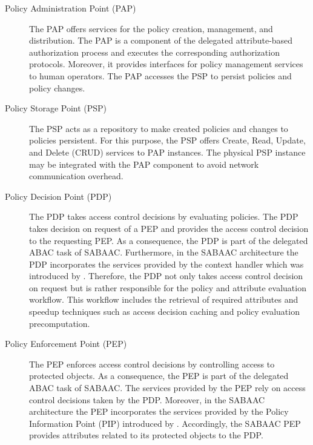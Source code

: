 \begin{description}
    \item[Policy Administration Point (PAP)] The PAP offers services for the policy creation, management, and distribution.
    The PAP is a component of the delegated attribute-based authorization process and executes the corresponding authorization protocols.
    Moreover, it provides interfaces for policy management services to human operators.
    The PAP accesses the PSP to persist policies and policy changes.
    \item[Policy Storage Point (PSP)] The PSP acts as a repository to make created policies and changes to policies persistent.
    For this purpose, the PSP offers Create, Read, Update, and Delete (CRUD) services to PAP instances.
    The physical PSP instance may be integrated with the PAP component to avoid network communication overhead.
    \item[Policy Decision Point (PDP)] The PDP takes access control decisions by evaluating policies.
    The PDP takes decision on request of a PEP and provides the access control decision to the requesting PEP.
    As a consequence, the PDP is part of the delegated ABAC task of SABAAC.
    Furthermore, in the SABAAC architecture the PDP incorporates the services provided by the context handler which was introduced by \citeauthor{Hu2014} \cite{Hu2014}.
    Therefore, the PDP not only takes access control decision on request but is rather responsible for the policy and attribute evaluation workflow.
    This workflow includes the retrieval of required attributes and speedup techniques such as access decision caching and policy evaluation precomputation.
    \item[Policy Enforcement Point (PEP)] The PEP enforces access control decisions by controlling access to protected objects.
    As a consequence, the PEP is part of the delegated ABAC task of SABAAC.
    The services provided by the PEP rely on access control decisions taken by the PDP.
    Moreover, in the SABAAC architecture the PEP incorporates the services provided by the Policy Information Point (PIP) introduced by \citeauthor{Hu2014} \cite{Hu2014}.
    Accordingly, the SABAAC PEP provides attributes related to its protected objects to the PDP.
\end{description}

